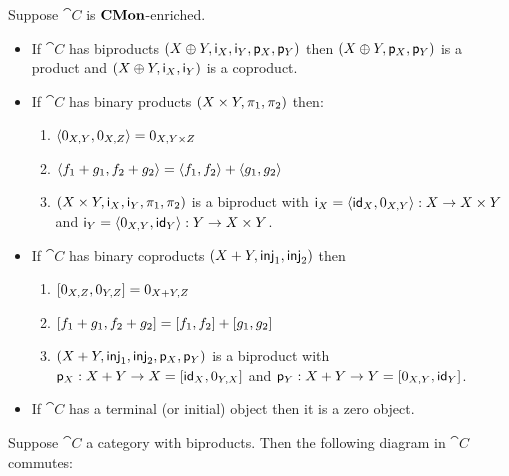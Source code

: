 \begin{proposition}
\label{prop:biproduct:from-product-or-coproduct}
Suppose $\cat{C}$ is $\mathbf{CMon}$-enriched.
\begin{itemize}
\item If $\cat{C}$ has biproducts $(X \oplus Y, \mathsf{i}_X, \mathsf{i}_Y, \mathsf{p}_X, \mathsf{p}_Y)$ then $(X
\oplus Y, \mathsf{p}_X, \mathsf{p}_Y)$ is a product and $(X \oplus Y, \mathsf{i}_X, \mathsf{i}_Y)$ is a coproduct.
\item If $\cat{C}$ has binary products $(X \times Y, \pi_1, \pi_2)$ then:
\begin{enumerate}
\item $\langle 0_{X,Y}, 0_{X,Z}\rangle = 0_{X,Y \times Z}$
\item $\langle f_1 + g_1, f_2 + g_2\rangle = \langle f_1, f_2\rangle + \langle g_1, g_2\rangle$
\item $(X \times Y, \mathsf{i}_X, \mathsf{i}_Y, \pi_1, \pi_2)$ is a biproduct with $\mathsf{i}_X =
\langle \mathsf{id}_X, 0_{X,Y}\rangle: X \to X \times Y$ and $\mathsf{i}_Y = \langle 0_{X,Y}, \mathsf{id}_Y\rangle: Y \to X \times Y$.
\end{enumerate}
\item If $\cat{C}$ has binary coproducts $(X + Y, \mathsf{inj}_1, \mathsf{inj}_2)$ then
\begin{enumerate}
\item $[0_{X,Z}, 0_{Y,Z}] = 0_{X + Y,Z}$
\item $[f_1 + g_1, f_2 + g_2] = [f_1, f_2] + [g_1, g_2]$
\item $(X + Y, \mathsf{inj}_1, \mathsf{inj}_2, \mathsf{p}_X, \mathsf{p}_Y)$ is a biproduct with $\mathsf{p}_X: X + Y \to X =
[\mathsf{id}_X, 0_{Y,X}]$ and $\mathsf{p}_Y: X + Y \to Y = [0_{X,Y}, \mathsf{id}_Y]$.
\end{enumerate}
\item If $\cat{C}$ has a terminal (or initial) object then it is a zero object.
\end{itemize}
\end{proposition}

\begin{proposition}
\label{prop:biproduct:prod-coprod}
Suppose $\cat{C}$ a category with biproducts. Then the following diagram in $\cat{C}$ commutes:

\begin{center}
\end{center}
\end{proposition}

